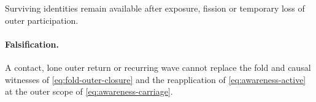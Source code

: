 Surviving identities remain available after exposure, fission
or temporary loss of outer participation.

\paragraph{Falsification.}
A contact, lone outer return or recurring wave cannot replace the fold and
causal witnesses of \eqref{eq:fold-outer-closure} and the reapplication of
\eqref{eq:awareness-active} at the outer scope of \eqref{eq:awareness-carriage}.

